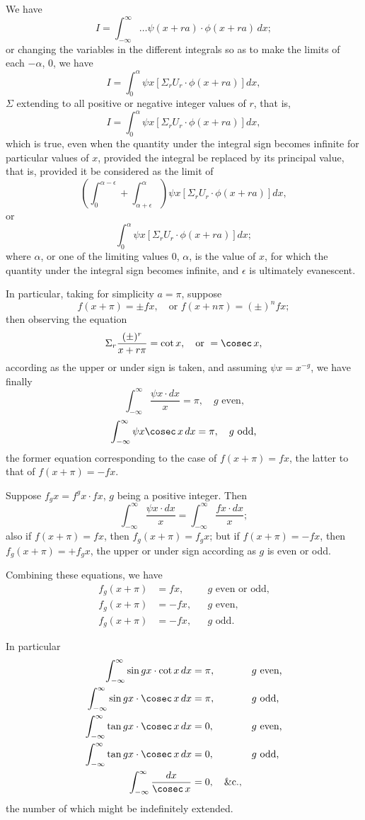 \documentclass[11pt,a4paper]{book}
\begin{document}
We have
\[I = \int_{-\infty}^{\infty} \ldots \psi(x+ra) \cdot \phi(x+ra) \, dx;\]
or changing the variables in the different integrals so as to make the limits of each $-\alpha$, $0$, we have
\[I = \int_0^{\alpha} \psi x \left[\Sigma_r U_r \cdot \phi(x+ra)\right] dx,\]
$\Sigma$ extending to all positive or negative integer values of $r$, that is,
\begin{equation}I = \int_0^{\alpha} \psi x \left[\Sigma_r U_r \cdot \phi(x+ra)\right] dx,\tag{A}\end{equation}
which is true, even when the quantity under the integral sign becomes infinite for particular values of $x$, provided the integral be replaced by its principal value, that is, provided it be considered as the limit of
\[\left(\int_0^{\alpha-\epsilon} + \int_{\alpha+\epsilon}^{\alpha}\right) \psi x \left[\Sigma_r U_r \cdot \phi(x+ra)\right] dx,\]
or
\[\int_0^{\alpha} \psi x \left[\Sigma_r U_r \cdot \phi(x+ra)\right] dx;\]
where $\alpha$, or one of the limiting values $0$, $\alpha$, is the value of $x$, for which the quantity under the integral sign becomes infinite, and $\epsilon$ is ultimately evanescent.

In particular, taking for simplicity $a=\pi$, suppose
\[f(x+\pi) = \pm fx, \quad \text{or } f(x+n\pi) = (\pm)^n fx;\]
then observing the equation
\[\Sigma_r \frac{(\pm)^r}{x+r\pi} = \cot x, \quad \text{or } = \cosec\, x,\]
according as the upper or under sign is taken, and assuming $\psi x = x^{-g}$, we have finally
\[\int_{-\infty}^{\infty} \frac{\psi x \cdot dx}{x} = \pi, \quad g \text{ even,}\]
\[\int_{-\infty}^{\infty} \psi x \cosec\, x \, dx = \pi, \quad g \text{ odd,}\]
the former equation corresponding to the case of $f(x+\pi) = fx$, the latter to that of $f(x+\pi) = -fx$.

Suppose $f_g x = f^g x \cdot fx$, $g$ being a positive integer. Then
\[\int_{-\infty}^{\infty} \frac{\psi x \cdot dx}{x} = \int_{-\infty}^{\infty} \frac{fx \cdot dx}{x};\]
also if $f(x+\pi) = fx$, then $f_g(x+\pi) = f_g x$; but if $f(x+\pi) = -fx$, then $f_g(x+\pi) = +f_g x$, the upper or under sign according as $g$ is even or odd.

Combining these equations, we have
\begin{align*}
f_g(x+\pi) &= fx, && g \text{ even or odd,}\\
f_g(x+\pi) &= -fx, && g \text{ even,}\\
f_g(x+\pi) &= -fx, && g \text{ odd.}
\end{align*}

In particular
\begin{align*}
\int_{-\infty}^{\infty} \sin gx \cdot \cot x \, dx &= \pi, && g \text{ even,}\\
\int_{-\infty}^{\infty} \sin gx \cdot \cosec\, x \, dx &= \pi, && g \text{ odd,}\\
\int_{-\infty}^{\infty} \tan gx \cdot \cosec\, x \, dx &= 0, && g \text{ even,}\\
\int_{-\infty}^{\infty} \tan gx \cdot \cosec\, x \, dx &= 0, && g \text{ odd,}\\
\int_{-\infty}^{\infty} \frac{dx}{\cosec\, x} &= 0, \quad \&\text{c.},
\end{align*}
the number of which might be indefinitely extended.
\end{document}
